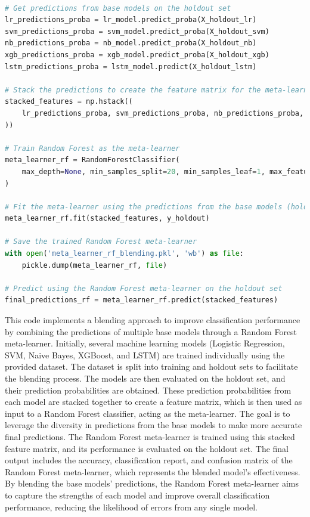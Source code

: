 \begin{tcolorbox}[colback=gray!5!white, colframe=gray!80!black, boxrule=0.5pt, title=Blending with Random Forest as Meta-Learner]
    \begin{lstlisting}[language=Python]

# Get predictions from base models on the holdout set
lr_predictions_proba = lr_model.predict_proba(X_holdout_lr)
svm_predictions_proba = svm_model.predict_proba(X_holdout_svm)
nb_predictions_proba = nb_model.predict_proba(X_holdout_nb)
xgb_predictions_proba = xgb_model.predict_proba(X_holdout_xgb)
lstm_predictions_proba = lstm_model.predict(X_holdout_lstm)

# Stack the predictions to create the feature matrix for the meta-learner (blending)
stacked_features = np.hstack((
    lr_predictions_proba, svm_predictions_proba, nb_predictions_proba, xgb_predictions_proba, lstm_predictions_proba
))

# Train Random Forest as the meta-learner
meta_learner_rf = RandomForestClassifier(
    max_depth=None, min_samples_split=20, min_samples_leaf=1, max_features='sqrt', bootstrap=False, random_state=42
)

# Fit the meta-learner using the predictions from the base models (holdout set)
meta_learner_rf.fit(stacked_features, y_holdout)

# Save the trained Random Forest meta-learner
with open('meta_learner_rf_blending.pkl', 'wb') as file:
    pickle.dump(meta_learner_rf, file)

# Predict using the Random Forest meta-learner on the holdout set
final_predictions_rf = meta_learner_rf.predict(stacked_features)
\end{lstlisting}
\end{tcolorbox}

\noindent
This code implements a blending approach to improve classification performance by combining the predictions of multiple base models through a Random Forest meta-learner. Initially, several machine learning models (Logistic Regression, SVM, Naive Bayes, XGBoost, and LSTM) are trained individually using the provided dataset. The dataset is split into training and holdout sets to facilitate the blending process. The models are then evaluated on the holdout set, and their prediction probabilities are obtained. These prediction probabilities from each model are stacked together to create a feature matrix, which is then used as input to a Random Forest classifier, acting as the meta-learner. The goal is to leverage the diversity in predictions from the base models to make more accurate final predictions. The Random Forest meta-learner is trained using this stacked feature matrix, and its performance is evaluated on the holdout set. The final output includes the accuracy, classification report, and confusion matrix of the Random Forest meta-learner, which represents the blended model's effectiveness. By blending the base models’ predictions, the Random Forest meta-learner aims to capture the strengths of each model and improve overall classification performance, reducing the likelihood of errors from any single model.

